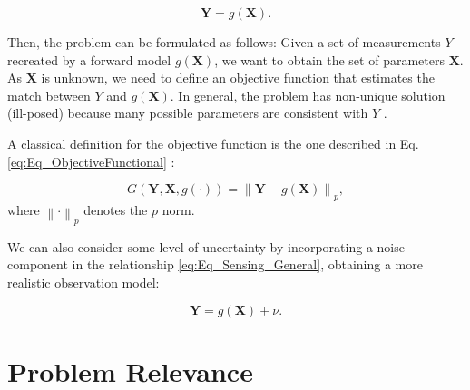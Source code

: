 \begin{equation}
\label{eq:Eq_Sensing_General}
	\mathbf{Y} = g(\mathbf{X}) .
\end{equation}

Then, the problem can be formulated as follows: Given a set of measurements $Y$ recreated by a forward model $g(\mathbf{X})$, we want to obtain the set of parameters $\mathbf{X}$. As $\mathbf{X}$ is unknown, we need to define an objective function that estimates the match between $Y$ and $g(\mathbf{X})$. In general, the problem has non-unique solution (ill-posed) because many possible parameters are consistent with $Y$ .

A classical definition for the objective function is the one described in Eq. \eqref{eq:Eq_ObjectiveFunctional} :

\begin{equation}
\label{eq:Eq_ObjectiveFunctional}
	G(\mathbf{Y},\mathbf{X},g(\cdot)) = \left\|  \mathbf{Y} - g(\mathbf{X}) \right\|_{p} ,
\end{equation}
where $\left\|  \cdot \right\|_{p}$ denotes the $p$ norm.

We can also consider some level of uncertainty by incorporating a noise component in the relationship \eqref{eq:Eq_Sensing_General}, obtaining a more realistic observation model:

\begin{equation}
\label{eq:Eq_Sensing_General_Noise}
	\mathbf{Y} = g(\mathbf{X}) + \nu .
\end{equation}







































\section{Problem Relevance}
\label{sec_intro_Relevance}


